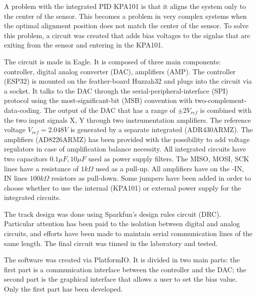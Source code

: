 A problem with the integrated PID KPA101 is that it aligns the system only to the center of the sensor. This becomes a problem in very complex systems when the optimal alignment position does not match the center of the sensor.
To solve this problem, a circuit was created that adds bias voltages to the signlas that are exiting from the sensor and entering in the KPA101.

The circuit is made in Eagle. It is composed of three main components: controller, digital analog converter (DAC), amplifiers (AMP).
The controller (ESP32) is mounted on the feather-board Huzzah32 and plugs into the circuit via a socket. It talks to the DAC through the serial-peripheral-interface (SPI) protocol using the most-significant-bit (MSB) convention with two-complement-data-coding.
The output of the DAC that has a range of $\pm 2 V_{ref}$ is combined with the two input signals X, Y through two instrumentation amplifiers. The reference voltage $V_{ref} = 2.048V$ is generated by a separate integrated (ADR430ARMZ).
The amplifiers (AD8226ARMZ) has been provided with the possibility to add voltage regulators in case of amplification balance necessity.
All integrated circuits have two capacitors $0.1 \mu F, 10 \mu F$ used as power supply filters. The MISO, MOSI, SCK lines have a resistance of $1 k \Omega$ used as a pull-up.
All amplifiers have on the -IN, IN lines $100 k \Omega$ resistors as pull-down. Some jumpers have been added in order to choose whether to use the internal (KPA101) or external power supply for the integrated circuits.

The track design was done using Sparkfun’s design rules circuit (DRC). Particular attention has been paid to the isolation between digital and analog circuits, and efforts have been made to maintain serial communication lines of the same length. The final circuit was tinned in the laboratory and tested.

The software was created via PlatformIO. It is divided in two main parts: the first part is a communication interface between the controller and the DAC; the second part is the graphical interface that allows a user to set the bias value. Only the first part has been developed.


